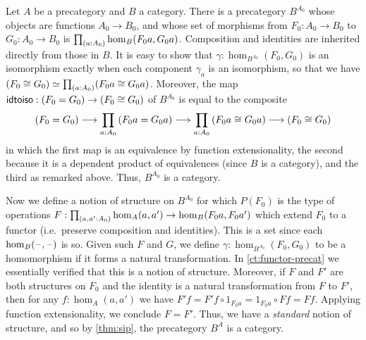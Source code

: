 \documentclass[hott-all.tex]{subfiles}
\begin{document}

\begin{eg}
  Let $A$ be a precategory and $B$ a category.
  There is a precategory $B^{A_0}$ whose objects are functions $A_0 \to B_0$, and whose set of morphisms from $F_0:A_0 \to B_0$ to $G_0:A_0 \to B_0$ is $\prd{a:A_0} \hom_B(F_0 a, G_0 a)$.
  Composition and identities are inherited directly from those in $B$.
  It is easy to show that $\gamma:\hom_{B^{A_0}}(F_0, G_0)$ is an isomorphism exactly when each component $\gamma_a$ is an isomorphism, so that we have $\eqv{(F_0 \cong G_0)}{\prd{a:A_0} (F_0 a \cong G_0 a)}$.
  Moreover, the map $\mathsf{idtoiso} : (F_0 = G_0) \to (F_0 \cong G_0)$ of $B^{A_0}$ is equal to the composite
  \[ (F_0 = G_0) \longrightarrow \prd{a:A_0} (F_0 a  = G_0 a) \longrightarrow \prd{a:A_0} (F_0 a \cong G_0 a) \longrightarrow (F_0 \cong G_0) \]
  in which the first map is an equivalence by function extensionality, the second because it is a dependent product of equivalences (since $B$ is a category), and the third as remarked above.
  Thus, $B^{A_0}$ is a category.

  Now we define a notion of structure on $B^{A_0}$ for which $P(F_0)$ is the type of operations $F:\prd{a,a':A_0} \hom_A(a,a') \to \hom_B(F_0 a,F_0 a')$ which extend $F_0$ to a functor (i.e.\ preserve composition and identities).
  This is a set since each $\hom_B(\mathord{\hspace{1pt}\text{--}\hspace{1pt}},\mathord{\hspace{1pt}\text{--}\hspace{1pt}})$ is so.
  Given such $F$ and $G$, we define $\gamma:\hom_{B^{A_0}}(F_0, G_0)$ to be a homomorphism if it forms a natural transformation.
  In \cref{ct:functor-precat} we essentially verified that this is a notion of structure.
  Moreover, if $F$ and $F'$ are both structures on $F_0$ and the identity is a natural transformation from $F$ to $F'$, then for any $f:\hom_A(a,a')$ we have $F'f = F'f \circ 1_{F_0 a} = 1_{F_0 a}\circ F f = F f$.
  Applying function extensionality, we conclude $F = F'$.
  Thus, we have a \emph{standard} notion of structure, and so by \cref{thm:sip}, the precategory $B^A$ is a category.
\end{eg}
\end{document}

